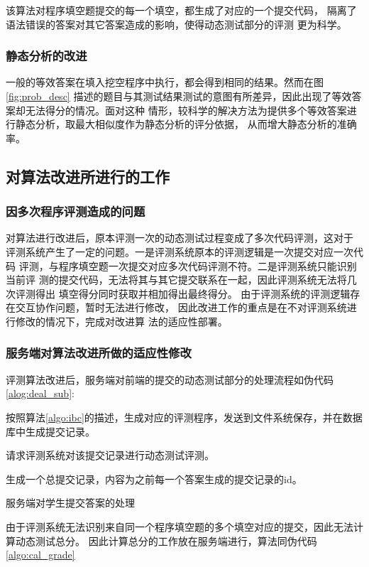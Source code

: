 该算法对程序填空题提交的每一个填空，都生成了对应的一个提交代码，
隔离了语法错误的答案对其它答案造成的影响，使得动态测试部分的评测
更为科学。

\subsubsection{静态分析的改进}

一般的等效答案在填入挖空程序中执行，都会得到相同的结果。然而在图\ref{fig:prob_desc}
描述的题目与其测试结果测试的意图有所差异，因此出现了等效答案却无法得分的情况。面对这种
情形，较科学的解决方法为提供多个等效答案进行静态分析，取最大相似度作为静态分析的评分依据，
从而增大静态分析的准确率。

\subsection{对算法改进所进行的工作}

\subsubsection{因多次程序评测造成的问题}
对算法进行改进后，原本评测一次的动态测试过程变成了多次代码评测，这对于
评测系统产生了一定的问题。一是评测系统原本的评测逻辑是一次提交对应一次代码
评测，与程序填空题一次提交对应多次代码评测不符。二是评测系统只能识别当前评
测的提交代码，无法将其与其它提交联系在一起，因此评测系统无法将几次评测得出
填空得分同时获取并相加得出最终得分。
由于评测系统的评测逻辑存在交互协作问题，暂时无法进行修改，
因此改进工作的重点是在不对评测系统进行修改的情况下，完成对改进算
法的适应性部署。

\subsubsection{服务端对算法改进所做的适应性修改}
评测算法改进后，服务端对前端的提交的动态测试部分的处理流程如伪代码\ref{alog:deal_sub}:
\begin{algorithm}[h]
 {
  按照算法\ref{algo:ibc}的描述，生成对应的评测程序，发送到文件系统保存，并在数据库中生成提交记录。

  请求评测系统对该提交记录进行动态测试评测。
}
生成一个总提交记录，内容为之前每一个答案生成的提交记录的id。
\caption{服务端对学生提交答案的处理}
\label{algo:deal_sub}
\end{algorithm}

由于评测系统无法识别来自同一个程序填空题的多个填空对应的提交，因此无法计算动态测试总分。
因此计算总分的工作放在服务端进行，算法同伪代码\ref{algo:cal_grade}

